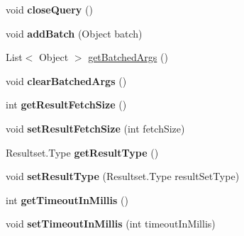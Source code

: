 \begin{DoxyCompactItemize}
void {\bfseries close\+Query} ()
\item 
\mbox{\label{interfacecom_1_1mysql_1_1cj_1_1_query_a726941dcc741acae509b16f14730966a}} 
void {\bfseries add\+Batch} (Object batch)
\item 
List$<$ Object $>$ \mbox{\hyperlink{interfacecom_1_1mysql_1_1cj_1_1_query_af927782ce04741b0b0d3447e9b4f2a08}{get\+Batched\+Args}} ()
\item 
\mbox{\label{interfacecom_1_1mysql_1_1cj_1_1_query_a72ab11f1338a67459c15b31d1e808b14}} 
void {\bfseries clear\+Batched\+Args} ()
\item 
\mbox{\label{interfacecom_1_1mysql_1_1cj_1_1_query_a6f08d61e84781710d7e9c4680c2835b3}} 
int {\bfseries get\+Result\+Fetch\+Size} ()
\item 
\mbox{\label{interfacecom_1_1mysql_1_1cj_1_1_query_aa27382e91d04ac9f8f6944dc3949b652}} 
void {\bfseries set\+Result\+Fetch\+Size} (int fetch\+Size)
\item 
\mbox{\label{interfacecom_1_1mysql_1_1cj_1_1_query_a1e97cf75ff946bef7b89512a69199b90}} 
Resultset.\+Type {\bfseries get\+Result\+Type} ()
\item 
\mbox{\label{interfacecom_1_1mysql_1_1cj_1_1_query_abb2b03623cac9e35394b4ed22008f683}} 
void {\bfseries set\+Result\+Type} (Resultset.\+Type result\+Set\+Type)
\item 
\mbox{\label{interfacecom_1_1mysql_1_1cj_1_1_query_a54f609a5c08b91fe0008e9b3334d0d82}} 
int {\bfseries get\+Timeout\+In\+Millis} ()
\item 
\mbox{\label{interfacecom_1_1mysql_1_1cj_1_1_query_a9bdb29806cdcfabc9bf48c9c7872d777}} 
void {\bfseries set\+Timeout\+In\+Millis} (int timeout\+In\+Millis)
\item 
\mbox{\label{interfacecom_1_1mysql_1_1cj_1_1_query_a05d5eedcc76ab8fe224f4e2df0e4d274}} 

\end{DoxyCompactItemize}
